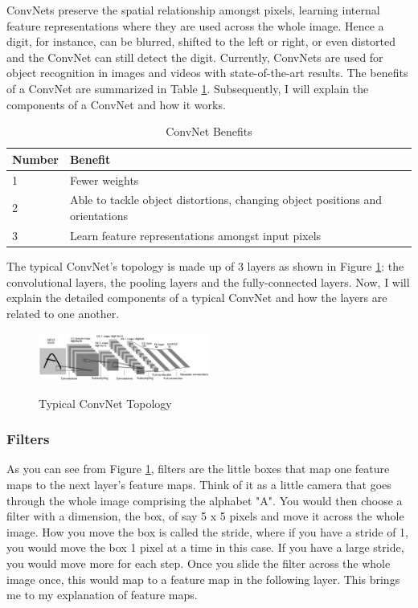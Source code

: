 \documentclass[twoside, column]{article}
\begin{document}
ConvNets preserve the spatial relationship amongst pixels, learning internal feature representations where they are used across the whole image. Hence a digit, for instance, can be blurred, shifted to the left or right, or even distorted and the ConvNet can still detect the digit. Currently, ConvNets are used for object recognition in images and videos with state-of-the-art results. The benefits of a ConvNet are summarized in Table \ref{cnnpros}. Subsequently, I will explain the components of a ConvNet and how it works.

\begin{table}[htp]
\caption{ConvNet Benefits}
\begin{center}
\begin{tabular}{llr}

\cmidrule(r){1-2}
Number & Benefit \\
\midrule
1 & Fewer weights\\
2 & Able to tackle object distortions, changing object positions and orientations\\ 
3 & Learn feature representations amongst input pixels \\

\end{tabular}
\end{center}
\label{cnnpros}
\end{table}


The typical ConvNet's topology is made up of 3 layers as shown in Figure \ref{convnet}: the convolutional layers, the pooling layers and the fully-connected layers. Now, I will explain the detailed components of a typical ConvNet and how the layers are related to one another.

\begin{figure}
\caption{Typical ConvNet Topology}
\centering
\includegraphics[width=0.5\textwidth]{convnet}
\label{convnet}
\end{figure}

\subsubsection{Filters}
As you can see from Figure \ref{convnet}, filters are the little boxes that map one feature maps to the next layer's feature maps. Think of it as a little camera that goes through the whole image comprising the alphabet "A". You would then choose a filter with a dimension, the box, of say 5 x 5 pixels and move it across the whole image. How you move the box is called the stride, where if you have a stride of 1, you would move the box 1 pixel at a time in this case. If you have a large stride, you would move more for each step. Once you slide the filter across the whole image once, this would map to a feature map in the following layer. This brings me to my explanation of feature maps. 
\end{document}
